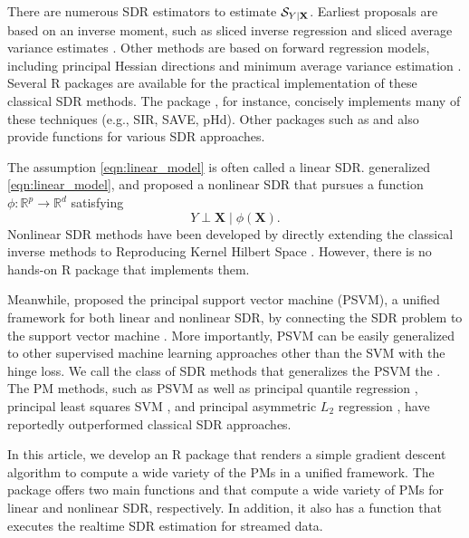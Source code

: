 There are numerous SDR estimators to estimate $\mathcal{S}_{Y\mid \mathbf{X}}$. Earliest proposals are based on an inverse moment, such as sliced inverse regression \citep[SIR,][]{Li1991::sir} and sliced average variance estimates \citep[SAVE,][]{Cook1991::save}. {Other methods are based on forward regression models, including principal Hessian directions \citep[pHd,][]{Li1992::phd} and minimum average variance estimation \citep[MAVE,][]{xia2002adaptive}.}
Several R packages are available for the practical implementation of these classical SDR methods. The  package \citep{weisberg2015dr}, for instance, concisely implements many of these techniques (e.g., SIR, SAVE, pHd). {Other packages such as  \citep{itdr_package} and  \citep{orthoDr_paper} also provide functions for various SDR approaches.}

The assumption \eqref{eqn:linear_model} is often called a linear SDR. \citet{Cook2007::nonlinear} generalized \eqref{eqn:linear_model}, and proposed a nonlinear SDR that pursues a function $\phi: \mathbb{R}^p \rightarrow \mathbb{R}^d$ satisfying
\begin{equation}
\label{eqn:nonlinear_model}
Y \perp \mathbf{X} \mid \phi(\mathbf{X}).
\end{equation}
Nonlinear SDR methods have been developed by directly extending the classical inverse methods to Reproducing Kernel Hilbert Space \citep[RKHS,][]{aronszajn1950theory}. However, there is no hands-on R  package that implements them.

Meanwhile, \citet{Li2011::psvm} proposed the principal support vector machine (PSVM), a unified framework for both linear and nonlinear SDR, by connecting the SDR problem to the support vector machine \citep[SVM,][]{vapnik1999nature}. More importantly, PSVM can be easily generalized to other supervised machine learning approaches other than the SVM with the hinge loss. We call the class of SDR methods that generalizes the PSVM the  \citep[PM,][]{shin2024concise}. {The PM methods, such as PSVM as well as principal quantile regression \citep[PQR,][]{wang2018principal}, principal least squares SVM \citep[PLSSVM,][]{artemiou2021real}, and principal asymmetric $L_2$ regression \citep[PALS,][]{soale2022sufficient}, have reportedly outperformed classical SDR approaches.}

In this article, we develop an R package  that renders a simple gradient descent algorithm to compute a wide variety of the PMs in a unified framework. 
The package offers two main functions  and  that compute a wide variety of PMs for linear and nonlinear SDR, respectively. In addition, it also has a function  that executes the realtime SDR estimation for streamed data. 

